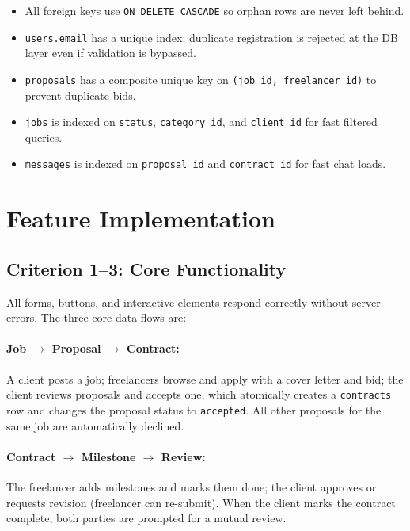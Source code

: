 \documentclass[12pt,a4paper]{article}
\begin{document}
\begin{itemize}[noitemsep]
  \item All foreign keys use \texttt{ON DELETE CASCADE} so orphan rows are never left behind.
  \item \texttt{users.email} has a unique index; duplicate registration is rejected at the DB layer even if validation is bypassed.
  \item \texttt{proposals} has a composite unique key on \texttt{(job\_id, freelancer\_id)} to prevent duplicate bids.
  \item \texttt{jobs} is indexed on \texttt{status}, \texttt{category\_id}, and \texttt{client\_id} for fast filtered queries.
  \item \texttt{messages} is indexed on \texttt{proposal\_id} and \texttt{contract\_id} for fast chat loads.
\end{itemize}

\section{Feature Implementation}

\subsection{Criterion 1--3: Core Functionality}

All forms, buttons, and interactive elements respond correctly without server errors. The three core data flows are:

\paragraph{Job $\rightarrow$ Proposal $\rightarrow$ Contract:}
A client posts a job; freelancers browse and apply with a cover letter and bid; the client reviews proposals and accepts one, which atomically creates a \texttt{contracts} row and changes the proposal status to \texttt{accepted}. All other proposals for the same job are automatically declined.

\paragraph{Contract $\rightarrow$ Milestone $\rightarrow$ Review:}
The freelancer adds milestones and marks them done; the client approves or requests revision (freelancer can re-submit). When the client marks the contract complete, both parties are prompted for a mutual review.
\end{document}
